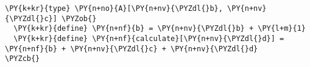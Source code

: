 \begin{Verbatim}[commandchars=\\\{\}]
\PY{k+kr}{type} \PY{n+no}{A}[\PY{n+nv}{\PYZdl{}b}, \PY{n+nv}{\PYZdl{}c}] \PYZob{}
  \PY{k+kr}{define} \PY{n+nf}{b} = \PY{n+nv}{\PYZdl{}b} + \PY{l+m}{1}
  \PY{k+kr}{define} \PY{n+nf}{calculate}[\PY{n+nv}{\PYZdl{}d}] = \PY{n+nf}{b} + \PY{n+nv}{\PYZdl{}c} + \PY{n+nv}{\PYZdl{}d}
\PYZcb{}
\end{Verbatim}
